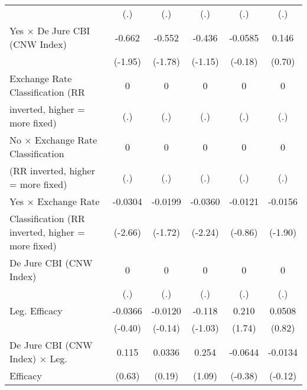 \begin{table}[htbp]
\begin{tabular}{l*{5}{c}}
                                        &      (.)         &      (.)         &      (.)         &      (.)         &      (.)         \\
\addlinespace
Yes $\times$ De Jure CBI (CNW Index)    &   -0.662         &   -0.552         &   -0.436         &  -0.0585         &    0.146         \\
                                        &  (-1.95)         &  (-1.78)         &  (-1.15)         &  (-0.18)         &   (0.70)         \\
\addlinespace
Exchange Rate Classification (RR        &        0         &        0         &        0         &        0         &        0         \\
inverted, higher = more fixed)          &      (.)         &      (.)         &      (.)         &      (.)         &      (.)         \\
\addlinespace
No $\times$ Exchange Rate Classification&        0         &        0         &        0         &        0         &        0         \\
(RR inverted, higher = more fixed)      &      (.)         &      (.)         &      (.)         &      (.)         &      (.)         \\
\addlinespace
Yes $\times$ Exchange Rate              &  -0.0304\sym{**} &  -0.0199         &  -0.0360\sym{*}  &  -0.0121         &  -0.0156         \\
Classification (RR inverted, higher = more fixed)&  (-2.66)         &  (-1.72)         &  (-2.24)         &  (-0.86)         &  (-1.90)         \\
\addlinespace
De Jure CBI (CNW Index)                 &        0         &        0         &        0         &        0         &        0         \\
                                        &      (.)         &      (.)         &      (.)         &      (.)         &      (.)         \\
\addlinespace
Leg. Efficacy                           &  -0.0366         &  -0.0120         &   -0.118         &    0.210         &   0.0508         \\
                                        &  (-0.40)         &  (-0.14)         &  (-1.03)         &   (1.74)         &   (0.82)         \\
\addlinespace
De Jure CBI (CNW Index) $\times$ Leg.   &    0.115         &   0.0336         &    0.254         &  -0.0644         &  -0.0134         \\
Efficacy                                &   (0.63)         &   (0.19)         &   (1.09)         &  (-0.38)         &  (-0.12)         \\

\end{tabular}
\end{table}

